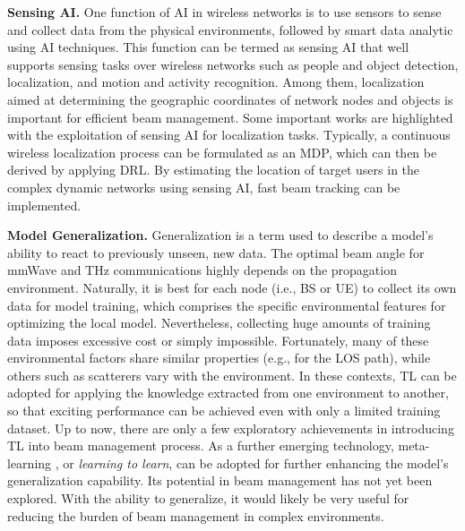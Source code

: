 \documentclass[journal,comsoc]{IEEEtran}
\begin{document}
{\bf{Sensing AI.}} One function of AI in wireless networks is to use sensors to sense and collect data from the physical environments, followed by smart data analytic using AI techniques. This function can be termed as sensing AI that well supports sensing tasks over wireless networks such as people and object detection, localization, and motion and activity recognition. Among them, localization aimed at determining the geographic coordinates of network nodes and objects is important for efficient beam management. Some important works are highlighted with the exploitation of sensing AI for localization tasks. Typically, a continuous wireless localization process can be formulated as an MDP, which can then be derived by applying DRL. By estimating the location of target users in the complex dynamic networks using sensing AI, fast beam tracking can be implemented.



{\bf{Model Generalization.}} Generalization is a term used to describe a model's ability to react to previously unseen, new data. The optimal beam angle for mmWave and THz communications highly depends on the propagation environment. Naturally, it is best for each node (i.e., BS or UE) to collect its own data for model training, which comprises the specific environmental features for optimizing the local model. Nevertheless, collecting huge amounts of training data imposes excessive cost or simply impossible. Fortunately, many of these environmental factors share similar properties (e.g., for the LOS path), while others such as scatterers vary with the environment. In these contexts, TL can be adopted for applying the knowledge extracted from one environment to another, so that exciting performance can be achieved even with only a limited training dataset. Up to now, there are only a few exploratory achievements in introducing TL into beam management process. As a further emerging technology, meta-learning \cite{Meta-Learning-2020}, or \emph{learning to learn}, can be adopted for further enhancing the model's generalization capability. Its potential in beam management has not yet been explored. With the ability to generalize, it would likely be very useful for reducing the burden of beam management in complex environments.
\end{document}
